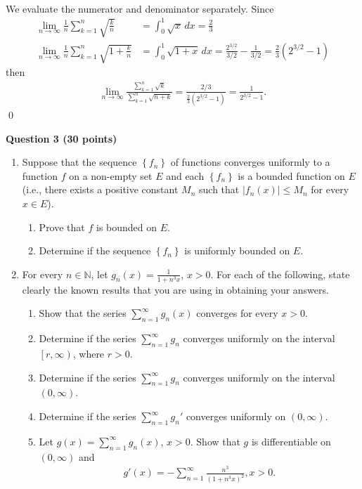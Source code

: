 \documentclass[11pt]{amsart}
\theoremstyle{plain}
\numberwithin{equation}{section}
\begin{document}
\begin{enumerate}[label=\textbf{(\alph*)}]
\begin{align*}
\end{align*}
We evaluate the numerator and denominator separately. Since
\begin{align*}
    \lim_{n\to\infty}\frac{1}{n}\sum_{k=1}^{n}\sqrt{\frac{k}{n}}&=\int_{0}^{1}\sqrt{x}\,dx=\frac{2}{3}
    \\
    \lim_{n\to\infty}\frac{1}{n}\displaystyle\sum_{k=1}^{n}\sqrt{1+\frac{k}{n}}&=\int_{0}^{1}\sqrt{1+x}\,dx=\frac{2^{3/2}}{3/2}-\frac{1}{3/2}=\frac{2}{3}\left(2^{3/2}-1\right)
\end{align*}
then
\begin{align*}
    \lim_{n\to\infty}\frac{\displaystyle\sum_{k=1}^{n}\sqrt{k}}{\displaystyle\sum_{k=1}^{n}\sqrt{n+k}}=\frac{2/3}{\frac{2}{3}\left(2^{3/2}-1\right)}=\frac{1}{2^{3/2}-1}.
\end{align*} \qed 
\end{enumerate}
\textbf{Question 3 (30 points)}
\begin{enumerate}[label=\textbf{(\alph*)}]
    \itemsep 0em
    \item Suppose that the sequence $\left\{f_{n}\right\}$ of functions converges uniformly to a function $f$ on a non-empty set $E$ and each $\left\{f_{n}\right\}$ is a bounded function on $E$ (i.e., there exists a positive constant $M_{n}$ such that $\left|f_{n}(x)\right|\leq M_{n}$ for every $x\in E$).
    \begin{enumerate}[label=\textbf{(\roman*)}]
        \itemsep 0em
        \item Prove that $f$ is bounded on $E$.
        \item Determine if the sequence $\left\{f_{n}\right\}$ is uniformly bounded on $E$.
    \end{enumerate}
    \item For every $n\in\mathbb{N}$, let $g_{n}(x)=\frac{1}{1+n^{3}x}$, $x>0$. For each of the following, state clearly the known results that you are using in obtaining your answers.
    \begin{enumerate}[label=\textbf{(\roman*)}]
        \itemsep 0em
        \item Show that the series $\sum_{n=1}^{\infty}g_{n}(x)$ converges for every $x>0$.
        \item Determine if the series $\sum_{n=1}^{\infty}g_{n}$ converges uniformly on the interval $\left[r,\infty\right)$, where $r>0$.
        \item Determine if the series $\sum_{n=1}^{\infty}g_{n}$ converges uniformly on the interval $\left(0,\infty\right)$.
        \item Determine if the series $\sum_{n=1}^{\infty}g_{n}'$ converges uniformly on $\left(0,\infty\right)$.
        \item Let $g(x)=\sum_{n=1}^{\infty}g_{n}(x)$, $x>0$. Show that $g$ is differentiable on $\left(0,\infty\right)$ and
\begin{align*}
    g'(x)=-\sum_{n=1}^{\infty}\frac{n^{3}}{\left(1+n^{3}x\right)^{2}},x>0.
\end{align*}
    \end{enumerate}
\end{enumerate}
\end{document}
